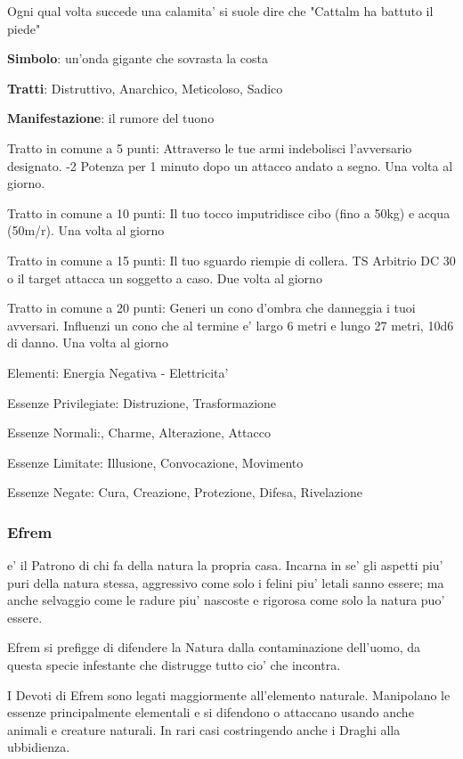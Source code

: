 \documentclass[a4paper,11pt,twoside,openany]{book}
\begin{document}
{Ogni qual volta succede una calamita' si suole dire che "Cattalm ha battuto il piede"

\textbf{Simbolo}: un'onda gigante che sovrasta la costa

\textbf{Tratti}: Distruttivo, Anarchico, Meticoloso, Sadico

\textbf{Manifestazione}: il rumore del tuono

\bigskip

Tratto in comune a 5 punti: Attraverso le tue armi indebolisci l'avversario designato. -2 Potenza per 1 minuto dopo un attacco andato a segno. Una volta al giorno.

Tratto in comune a 10 punti: Il tuo tocco imputridisce cibo (fino a 50kg) e acqua (50m/r). Una volta al giorno

Tratto in comune a 15 punti: Il tuo sguardo riempie di collera. TS Arbitrio DC 30 o il target attacca un soggetto a caso. Due volta al giorno

Tratto in comune a 20 punti: Generi un cono d'ombra che danneggia i tuoi avversari. Influenzi un cono che al termine e' largo 6 metri e lungo 27 metri, 10d6 di danno. Una volta al giorno

\bigskip

Elementi: Energia Negativa - Elettricita'

\bigskip

Essenze Privilegiate: Distruzione, Trasformazione

Essenze Normali:, Charme, Alterazione, Attacco

Essenze Limitate: Illusione, Convocazione, Movimento
 
Essenze Negate: Cura, Creazione, Protezione, Difesa, Rivelazione

\subsubsection{Efrem}

\label{efrem}

e' il Patrono di chi fa della natura la propria casa. Incarna in se' gli aspetti piu' puri della natura stessa, aggressivo come solo i felini piu' letali sanno essere; ma anche selvaggio come le radure piu' nascoste e rigorosa come solo la natura puo' essere.

Efrem si prefigge di difendere la Natura dalla contaminazione dell'uomo, da questa specie infestante che distrugge tutto cio' che incontra.

I Devoti di Efrem sono legati maggiormente all'elemento naturale. Manipolano le essenze principalmente elementali e si difendono o attaccano usando anche animali e creature naturali. In rari casi costringendo anche i Draghi alla ubbidienza.

}
\end{document}
